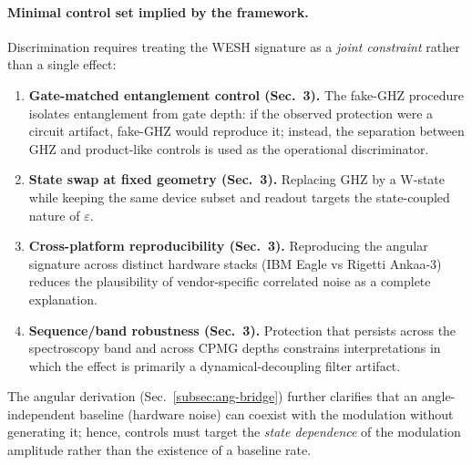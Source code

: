 \documentclass[12pt,a4paper]{article}
\numberwithin{equation}{section}
\begin{document}
\paragraph{Minimal control set implied by the framework.}
Discrimination requires treating the WESH signature as a \emph{joint constraint} rather than
a single effect:
\begin{enumerate}[leftmargin=1.6cm,itemsep=0.2cm]
\item \textbf{Gate-matched entanglement control (Sec.~3).}
The fake-GHZ procedure isolates entanglement from gate depth: if the observed protection were
a circuit artifact, fake-GHZ would reproduce it; instead, the separation between GHZ and product-like
controls is used as the operational discriminator.
\item \textbf{State swap at fixed geometry (Sec.~3).}
Replacing GHZ by a W-state while keeping the same device subset and readout targets the
state-coupled nature of $\varepsilon$.
\item \textbf{Cross-platform reproducibility (Sec.~3).}
Reproducing the angular signature across distinct hardware stacks (IBM Eagle vs Rigetti Ankaa-3)
reduces the plausibility of vendor-specific correlated noise as a complete explanation.
\item \textbf{Sequence/band robustness (Sec.~3).}
Protection that persists across the spectroscopy band and across CPMG depths constrains
interpretations in which the effect is primarily a dynamical-decoupling filter artifact.
\end{enumerate}
The angular derivation (Sec.~\ref{subsec:ang-bridge}) further clarifies that an angle-independent baseline (hardware noise) can coexist with
the modulation without generating it; hence, controls must target the \emph{state dependence}
of the modulation amplitude rather than the existence of a baseline rate.
\end{document}
